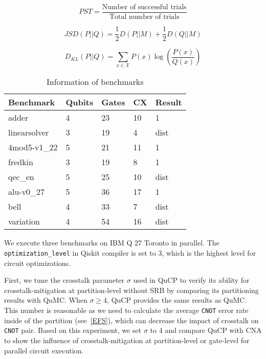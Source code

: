 \documentclass[conference]{IEEEtran}
\begin{document}
\begin{equation}
PST = \frac{\text{Number of successful trials}}{\text{Total number of trials}}
\label{eq:1}
\end{equation}

\begin{equation}
JSD(P || Q) = \frac{1}{2}D(P||M) + \frac{1}{2}D(Q || M)
\label{eq:2}
\end{equation}

\begin{equation}
D_{KL}(P||Q) = \sum_{x \in \mathcal{X}}P(x)\log(\frac{P(x)}{Q(x)})
\label{eq:3}
\end{equation}

\begin {table}[t]
\begin{center}
\caption{Information of benchmarks}
\label{table2}
\begin{tabular}{|l|l|l|l|l|}
\hline
\textbf{Benchmark} & \textbf{Qubits} & \textbf{Gates} & \textbf{CX} & \textbf{Result} \\
\hline
adder & 4 & 23 & 10 & 1\\
\hline
linearsolver & 3 & 19 & 4 & dist\\
\hline
4mod5-v1\_22 & 5 & 21 & 11 & 1\\
\hline
fredkin & 3 & 19 & 8 & 1\\
\hline
qec\_en & 5 & 25 & 10 & dist\\
\hline
alu-v0\_27 & 5 & 36 & 17 & 1\\
\hline
bell & 4 & 33 & 7 & dist\\
\hline
variation & 4 & 54 & 16 & dist\\
\hline
\end{tabular}
\end{center}
\end{table}

We execute three benchmarks on IBM Q 27 Toronto in parallel. The \texttt{optimization\_level} in Qiskit compiler is set to 3, which is the highest level for circuit optimizations. 

First, we tune the crosstalk parameter $\sigma$ used in QuCP to verify its ability for crosstalk-mitigation at partition-level without SRB by comparing its partitioning results with QuMC. When $\sigma \geq 4$, QuCP provides the same results as QuMC. This number is reasonable as we need to calculate the average \texttt{CNOT} error rate inside of the partition (see~\eqref{EFS}), which can decrease the impact of crosstalk on \texttt{CNOT} pair. Based on this experiment, we set $\sigma$ to 4 and compare QuCP with CNA to show the influence of crosstalk-mitigation at partition-level or gate-level for parallel circuit execution. 
\end{document}
